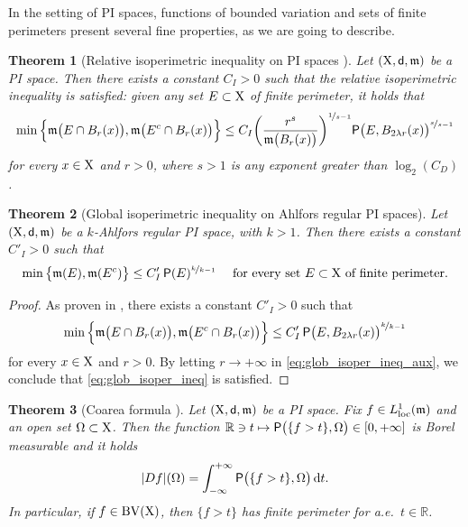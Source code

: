 \documentclass[reqno]{amsart}
\numberwithin{equation}{section}
\newcommand{\R}{\mathbb{R}}
\newcommand{\X}{{\rm X}}
\newcommand{\sfd}{{\sf d}}
\newcommand{\mm}{\mathfrak m}
\renewcommand{\d}{{\mathrm d}}
\newcommand{\1}{\mathbbm 1}
\newcommand{\loc}{{\rm loc}}
\newcommand{\BV}{{\rm BV}}
\renewcommand{\P}{{\sf P}}
\newtheorem{theorem}{Theorem}[section]
\begin{document}
%
%
In the setting of PI spaces, functions of bounded variation and sets of
finite perimeters present several fine properties, as we are going to describe.
%
%
\begin{theorem}[Relative isoperimetric inequality on PI spaces \cite{Miranda03}]
\label{thm:rel_isoper}
Let \((\X,\sfd,\mm)\) be a PI space. Then there exists a constant \(C_I>0\)
such that the \emph{relative isoperimetric inequality} is satisfied: given any
set \(E\subset\X\) of finite perimeter, it holds that
\begin{equation}\label{eq:rel_isoper_ineq}
\min\Big\{\mm\big(E\cap B_r(x)\big),\mm\big(E^c\cap B_r(x)\big)\Big\}
\leq C_I\bigg(\frac{r^s}{\mm\big(B_r(x)\big)}\bigg)^{\nicefrac{1}{s-1}}
\P\big(E,B_{2\lambda r}(x)\big)^{\nicefrac{s}{s-1}}
\end{equation}
for every \(x\in\X\) and \(r>0\), where \(s>1\) is any exponent
greater than \(\log_2(C_D)\).
\end{theorem}
%
%
\begin{theorem}[Global isoperimetric inequality on Ahlfors regular PI spaces]
\label{thm:global_isoper_Ahlfors}
Let \((\X,\sfd,\mm)\) be a \(k\)-Ahlfors regular PI space, with \(k>1\).
Then there exists a constant \(C'_I>0\) such that
\begin{equation}\label{eq:glob_isoper_ineq}
\min\big\{\mm(E),\mm(E^c)\big\}\leq C'_I\,\P(E)^{\nicefrac{k}{k-1}}\quad
\text{ for every set }E\subset\X\text{ of finite perimeter.}
\end{equation}
\end{theorem}
\begin{proof}
As proven in \cite{Miranda03}, there exists a constant \(C'_I>0\) such that
\begin{equation}\label{eq:glob_isoper_ineq_aux}
\min\Big\{\mm\big(E\cap B_r(x)\big),\mm\big(E^c\cap B_r(x)\big)\Big\}
\leq C'_I\,\P\big(E,B_{2\lambda r}(x)\big)^{\nicefrac{k}{k-1}}
\end{equation}
for every \(x\in\X\) and \(r>0\). By letting \(r\to +\infty\) in
\eqref{eq:glob_isoper_ineq_aux}, we conclude that \eqref{eq:glob_isoper_ineq}
is satisfied.
\end{proof}
%
%
\begin{theorem}[Coarea formula \cite{Miranda03}]\label{thm:coarea}
Let \((\X,\sfd,\mm)\) be a PI space. Fix \(f\in L^1_\loc(\mm)\) and
an open set \(\Omega\subset\X\). Then the function
\(\R\ni t\mapsto\P\big(\{f>t\},\Omega\big)\in[0,+\infty]\) is
Borel measurable and it holds
\begin{equation}\label{eq:coarea}
|Df|(\Omega)=\int_{-\infty}^{+\infty}\P\big(\{f>t\},\Omega\big)\,\d t.
\end{equation}
In particular, if \(f\in\BV(\X)\), then \(\{f>t\}\) has finite perimeter
for a.e.\ \(t\in\R\).
\end{theorem}
\end{document}
